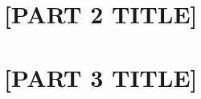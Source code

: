 \documentclass[a4paper, 11pt, twoside, openright,english]{thesis}
\numberwithin{equation}{section}
\numberwithin{figure}{section}
\numberwithin{table}{section}
\theoremstyle{plain}
\begin{document}
\part{[PART 2 TITLE]}
\label{part2}





\part{[PART 3 TITLE]}
\label{part3}


\printbibliography

%
\end{document}
